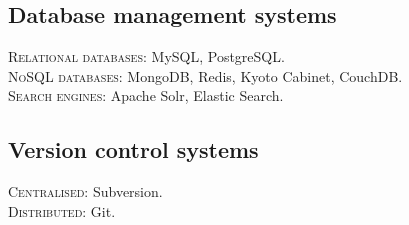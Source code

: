 \documentclass[11pt]{article}
\begin{document}
\subsection*{Database management systems}
\noindent
\textsc{Relational databases:} MySQL, PostgreSQL.\\
\textsc{NoSQL databases:} MongoDB, Redis, Kyoto Cabinet, CouchDB.\\
\textsc{Search engines:} Apache Solr, Elastic Search.

\subsection*{Version control systems}
\noindent
\textsc{Centralised:} Subversion.\\
\textsc{Distributed:} Git.
\end{document}
